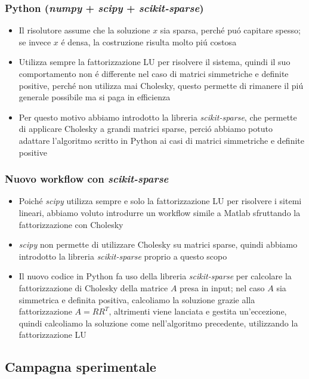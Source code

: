 \documentclass{beamer}
\begin{document}
\begin{frame}
	\frametitle{Python (\textit{numpy} + \textit{scipy} + \textit{scikit-sparse})}
	\begin{itemize}
		\item Il risolutore assume che la soluzione $x$ sia sparsa, perch\'e pu\'o capitare spesso; se invece $x$ \'e densa, la costruzione risulta molto pi\'u costosa
		\item Utilizza sempre la fattorizzazione LU per risolvere il sistema, quindi il suo comportamento non \'e differente nel caso di matrici simmetriche e definite positive, perch\'e non utilizza mai Cholesky, questo permette di rimanere il pi\'u generale possibile ma si paga in efficienza
		\item 	Per questo motivo abbiamo introdotto la libreria \textit{scikit-sparse}, che permette di applicare Cholesky a grandi matrici sparse, perci\'o abbiamo potuto adattare l'algoritmo scritto in Python ai casi di matrici simmetriche e definite positive
	\end{itemize}
\end{frame}

\begin{frame}
\frametitle{Nuovo workflow con \textit{scikit-sparse}}


\begin{itemize}
	\item Poich\'e \textit{scipy} utilizza sempre e solo la fattorizzazione LU per risolvere i sitemi lineari, abbiamo voluto introdurre un workflow simile a Matlab sfruttando la fattorizzazione con Cholesky

	\item \textit{scipy} non permette di utilizzare Cholesky su matrici sparse, quindi abbiamo introdotto la libreria \textit{scikit-sparse} proprio a questo scopo

	\item Il nuovo codice in Python fa uso della libreria \textit{scikit-sparse} per calcolare la fattorizzazione di Cholesky della matrice $A$ presa in input; nel caso $A$ sia simmetrica e definita positiva, calcoliamo la soluzione grazie alla fattorizzazione $A = RR^T$, altrimenti viene lanciata e gestita un'eccezione, quindi calcoliamo la soluzione come nell'algoritmo precedente, utilizzando la fattorizzazione LU
\end{itemize}


\end{frame}

\subsection{Campagna sperimentale}
\end{document}
